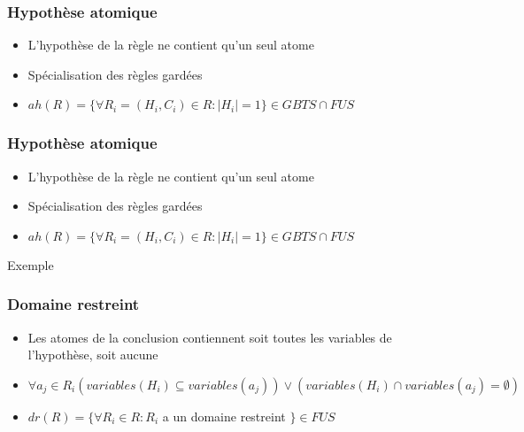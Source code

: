 \begin{frame}
	\frametitle{Hypothèse atomique}
	\begin{itemize}
		\item L'hypothèse de la règle ne contient qu'un seul atome
		\item Spécialisation des règles gardées
		\item $ah(R) = \{\forall R_i = (H_i,C_i) \in R : |H_i| = 1 \} \in GBTS \cap FUS$
	\end{itemize}
	\vspace{10mm}
\end{frame}

\begin{frame}
	\frametitle{Hypothèse atomique}
	\begin{itemize}
		\item L'hypothèse de la règle ne contient qu'un seul atome
		\item Spécialisation des règles gardées
		\item $ah(R) = \{\forall R_i = (H_i,C_i) \in R : |H_i| = 1 \} \in GBTS \cap FUS$
	\end{itemize}
	\vspace{10mm}
	\begin{exampleblock}{Exemple}
	\end{exampleblock}
\end{frame}

\begin{frame}
	\frametitle{Domaine restreint}
	\begin{itemize}
		\item Les atomes de la conclusion contiennent soit toutes les variables de
		l'hypothèse, soit aucune
		\item $\forall a_j \in R_i (variables(H_i) \subseteq variables(a_j)) \vee 
		(variables(H_i) \cap variables(a_j) = \emptyset)$
		\item $dr(R) = \{\forall R_i \in R : R_i$ a un domaine restreint $\} \in FUS$
	\end{itemize}
	\vspace{10mm}
\end{frame}

